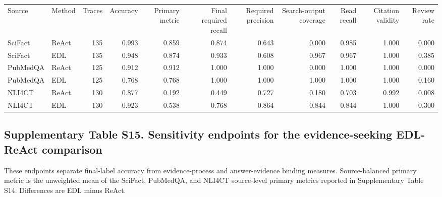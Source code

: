 \documentclass[
  8pt,
]{extarticle}
\begin{document}
\begin{center}
\begin{adjustbox}{max width=0.95\textwidth}
\begin{tabular}{@{}
llrrrrrrrrr@{}}
\toprule\noalign{}
Source & Method & Traces & Accuracy & Primary metric & Final required
recall & Required precision & Search-output coverage & Read recall &
Citation validity & Review rate \\

SciFact & ReAct & 135 & 0.993 & 0.859 & 0.874 & 0.643 & 0.000 & 0.985 &
1.000 & 0.000 \\
SciFact & EDL & 135 & 0.948 & 0.874 & 0.933 & 0.608 & 0.967 & 0.967 &
1.000 & 0.385 \\
PubMedQA & ReAct & 125 & 0.912 & 0.912 & 1.000 & 1.000 & 0.000 & 1.000 &
1.000 & 0.000 \\
PubMedQA & EDL & 125 & 0.768 & 0.768 & 1.000 & 1.000 & 1.000 & 1.000 &
1.000 & 0.160 \\
NLI4CT & ReAct & 130 & 0.877 & 0.192 & 0.449 & 0.727 & 0.180 & 0.703 &
0.992 & 0.008 \\
NLI4CT & EDL & 130 & 0.923 & 0.538 & 0.768 & 0.864 & 0.844 & 0.844 &
1.000 & 0.300 \\
\bottomrule
\end{tabular}
\end{adjustbox}
\end{center}

\hypertarget{supplementary-table-s15-sensitivity-endpoints-for-the-evidence-seeking-edl-react-comparison}{%
\subsection{Supplementary Table S15. Sensitivity endpoints for the
evidence-seeking EDL-ReAct
comparison}\label{supplementary-table-s15-sensitivity-endpoints-for-the-evidence-seeking-edl-react-comparison}}

These endpoints separate final-label accuracy from evidence-process and
answer-evidence binding measures. Source-balanced primary metric is the
unweighted mean of the SciFact, PubMedQA, and NLI4CT source-level
primary metrics reported in Supplementary Table S14. Differences are EDL
minus ReAct.
\end{document}
